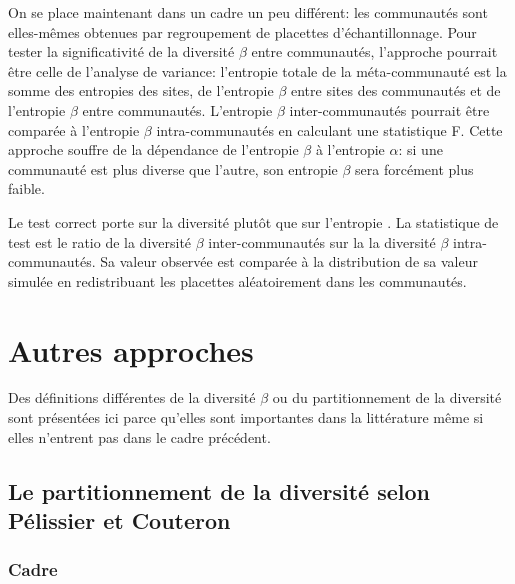 \documentclass[
  11pt,
  french,
  a4paper,
  extrafontsizes,onecolumn,openright
  ]{memoir}
\begin{document}
On se place maintenant dans un cadre un peu différent: les communautés sont elles-mêmes obtenues par regroupement de placettes d'échantillonnage.
Pour tester la significativité de la diversité \(\beta\) entre communautés, l'approche pourrait être celle de l'analyse de variance: l'entropie totale de la méta-communauté est la somme des entropies des sites, de l'entropie \(\beta\) entre sites des communautés et de l'entropie \(\beta\) entre communautés.
L'entropie \(\beta\) inter-communautés pourrait être comparée à l'entropie \(\beta\) intra-communautés en calculant une statistique F.
Cette approche souffre de la dépendance de l'entropie \(\beta\) à l'entropie \(\alpha\): si une communauté est plus diverse que l'autre, son entropie \(\beta\) sera forcément plus faible.

Le test correct porte sur la diversité plutôt que sur l'entropie \autocite{Richard-Hansen2015}.
La statistique de test est le ratio de la diversité \(\beta\) inter-communautés sur la la diversité \(\beta\) intra-communautés.
Sa valeur observée est comparée à la distribution de sa valeur simulée en redistribuant les placettes aléatoirement dans les communautés.

\hypertarget{sec:betaAutres}{%
\chapter{Autres approches}\label{sec:betaAutres}}

Des définitions différentes de la diversité \(\beta\) ou du partitionnement de la diversité sont présentées ici parce qu'elles sont importantes dans la littérature même si elles n'entrent pas dans le cadre précédent.

\hypertarget{le-partitionnement-de-la-diversituxe9-selon-puxe9lissier-et-couteron}{%
\section{Le partitionnement de la diversité selon Pélissier et Couteron}\label{le-partitionnement-de-la-diversituxe9-selon-puxe9lissier-et-couteron}}

\hypertarget{sec:PCcadre}{%
\subsection{Cadre}\label{sec:PCcadre}}



\scriptsize
\end{document}
